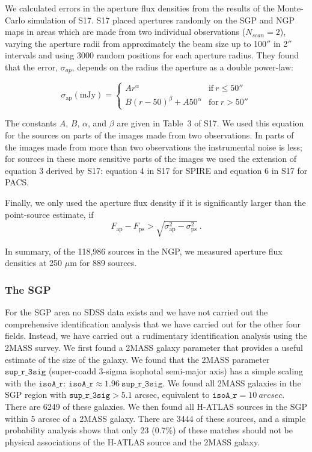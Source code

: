 \documentclass[useAMS,usenatbib]{mnras}
\begin{document}
We calculated errors in the aperture flux densities from the results
of the Monte-Carlo simulation of S17. S17 placed apertures randomly on
the SGP and NGP maps in areas which are made from two individual
observations ($N_{scan}=2$), varying the aperture radii from
approximately the beam size up to 100$''$ in 2$''$ intervals and using
3000 random positions for each aperture radius.  They found that the
error, $\sigma_{ap}$, depends on the radius the aperture as a double
power-law:

\begin{equation}
  \sigma_{\mathrm{ap}}(\mathrm{mJy}) =
  \begin{cases}
      Ar^\alpha &   \mathrm{if\ } r\le 50'' \\
      B(r-50)^\beta + A 50^\alpha & \mathrm{for\ } r>50''
    \end{cases}
\end{equation}

The constants $A$, $B$, $\alpha$, and $\beta$  are given in Table~3 of S17.
We used this equation for the sources on parts of the images made from two
observations. In parts of the images made from more than two observations
the instrumental noise is less; for sources in these more sensitive parts of
the images we used the extension of equation 3 derived by S17: equation
4 in S17 for SPIRE and equation 6 in S17 for PACS.

Finally, we only used the aperture flux density if
it is significantly larger than the point-source estimate, if
\begin{equation}
F_\mathrm{ap}- F_\mathrm{ps}>\sqrt{\sigma_\mathrm{ap}^2-\sigma_\mathrm{ps}^2}
\ .
\end{equation}

In summary, of the 118,986 sources in the NGP, we measured aperture
flux densities at 250 $\mu$m for 889 sources. 

\subsubsection{The SGP}

For the SGP area no SDSS data exists and we have not carried out the
comprehensive identification analysis that we have carried out for the
other four fields. Instead, we have carried out a rudimentary
identification analysis using the 2MASS survey. We first found a 2MASS
galaxy parameter that provides a useful estimate of the size of the
galaxy. We found that the 2MASS parameter $\mathtt{sup\_r\_3sig}$
(super-coadd 3-sigma isophotal semi-major axis) has a simple scaling
with the $\mathtt {isoA\_r}$:
$\mathtt{isoA\_r} \approx 1.96 \ \mathtt{sup\_r\_3sig}$.  We found all
2MASS galaxies in the SGP region with $\mathtt{sup\_r\_3sig}>5.1$
arcsec, equivalent to $\mathtt{isoA\_r}=10\ arcsec$. There are 6249 of
these galaxies. We then found all H-ATLAS sources in the SGP within 5
arcsec of a 2MASS galaxy. There are 3444 of these sources, and a
simple probability analysis shows that only 23 (0.7\%) of these
matches should not be physical associations of the H-ATLAS source and
the 2MASS galaxy.
\end{document}
